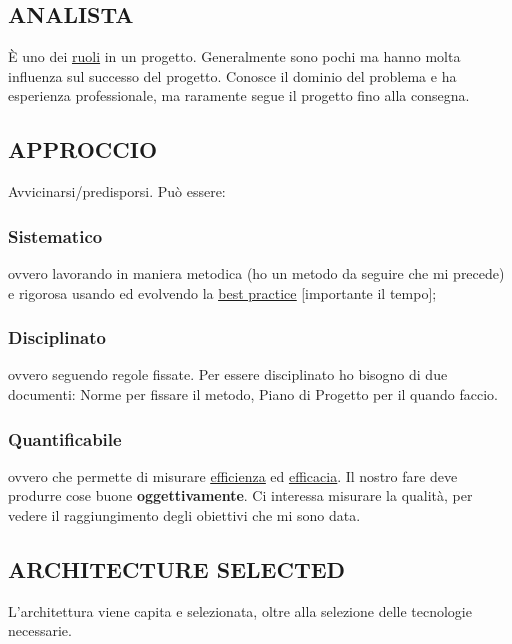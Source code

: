 		
		
		\subsection{ANALISTA}  \label{analista}
		È uno dei \underline{\hyperref[ruoli]{ruoli}} in un progetto. Generalmente sono pochi ma hanno molta influenza sul successo del progetto. Conosce il dominio del problema e ha esperienza professionale, ma raramente segue il progetto fino alla consegna.
		
		\subsection{APPROCCIO} \label{approccio} 
		Avvicinarsi/predisporsi. Può essere:
			\subsubsection{Sistematico} \label{sistematico}
			ovvero lavorando in maniera metodica (ho un metodo da seguire che mi precede) e rigorosa usando ed evolvendo la \underline{\hyperref[best]{best practice}} [importante il tempo];
			\subsubsection{Disciplinato} \label{disciplinato}
			ovvero seguendo regole fissate. Per essere disciplinato ho bisogno di due documenti: Norme per fissare il metodo, Piano di Progetto per il quando faccio.
			\subsubsection{Quantificabile} \label{quantificabile}
			ovvero che permette di misurare \underline{\hyperref[efficienza]{efficienza}} ed \underline{\hyperref[efficacia]{efficacia}}. Il nostro fare deve produrre cose buone \textbf{oggettivamente}. Ci interessa misurare la qualità, per vedere il raggiungimento degli obiettivi che mi sono data.
			
		\subsection{ARCHITECTURE SELECTED}		\label{architectureselected}
		L'architettura viene capita e selezionata, oltre alla selezione delle tecnologie necessarie.	
			
